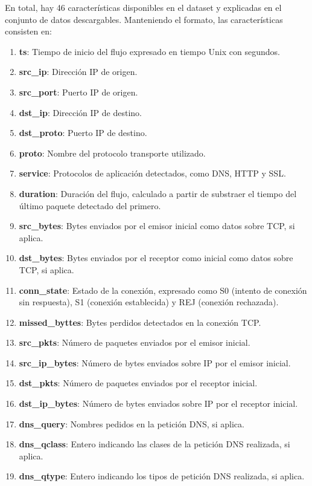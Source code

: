 En total, hay 46 características disponibles en el dataset y explicadas en el conjunto de datos descargables. Manteniendo el formato, las características consisten en:

\begin{enumerate}
  \item \textbf{ts}: Tiempo de inicio del flujo expresado en tiempo Unix con segundos.
  \item \textbf{src\_ip}: Dirección IP de origen.
  \item \textbf{src\_port}: Puerto IP de origen.
  \item \textbf{dst\_ip}: Dirección IP de destino.
  \item \textbf{dst\_proto}: Puerto IP de destino.
  \item \textbf{proto}: Nombre del protocolo transporte utilizado.
  \item \textbf{service}: Protocolos de aplicación detectados, como DNS, HTTP y SSL.
  \item \textbf{duration}: Duración del flujo, calculado a partir de substraer el tiempo del último paquete detectado del primero.
  \item \textbf{src\_bytes}: Bytes enviados por el emisor inicial como datos sobre TCP, si aplica.
  \item \textbf{dst\_bytes}: Bytes enviados por el receptor como inicial como datos sobre TCP, si aplica.
  \item \textbf{conn\_state}: Estado de la conexión, expresado como S0 (intento de conexión sin respuesta), S1 (conexión establecida) y REJ (conexión rechazada).
  \item \textbf{missed\_byttes}: Bytes perdidos detectados en la conexión TCP.
  \item \textbf{src\_pkts}: Número de paquetes enviados por el emisor inicial.
  \item \textbf{src\_ip\_bytes}: Número de bytes enviados sobre IP por el emisor inicial.
  \item \textbf{dst\_pkts}: Número de paquetes enviados por el receptor inicial.
  \item \textbf{dst\_ip\_bytes}: Número de bytes enviados sobre IP por el receptor inicial.
  \item \textbf{dns\_query}: Nombres pedidos en la petición DNS, si aplica.
  \item \textbf{dns\_qclass}: Entero indicando las clases de la petición DNS realizada, si aplica.
  \item \textbf{dns\_qtype}: Entero indicando los tipos de petición DNS realizada, si aplica.

\end{enumerate}
